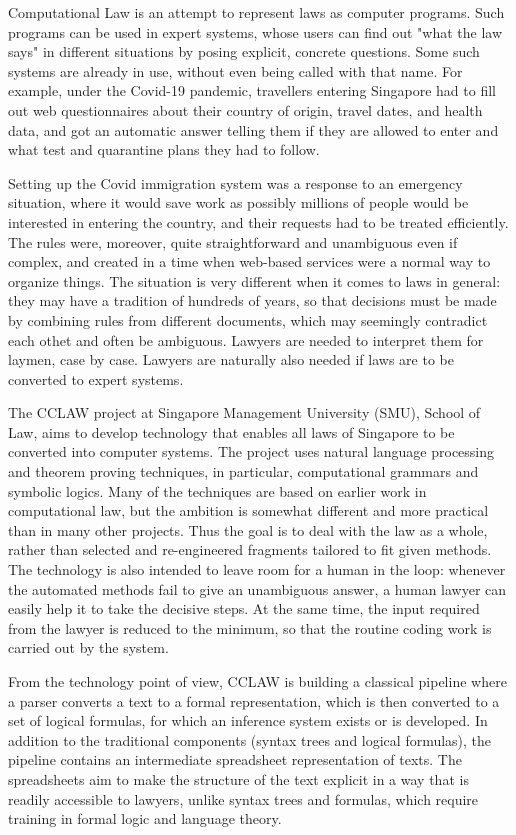 \documentclass{IOS-Book-Article}
\begin{document}
Computational Law is an attempt to represent laws as computer programs.
Such programs can be used in expert systems, whose users can find out "what the law says" in different situations by posing explicit, concrete questions.
Some such systems are already in use, without even being called with that name.
For example, under the Covid-19 pandemic, travellers entering Singapore had to fill out web questionnaires about their country of origin, travel dates, and health data, and got an automatic answer telling them if they are allowed to enter and what test and quarantine plans they had to follow.

Setting up the Covid immigration system was a response to an emergency situation, where it would save work as possibly millions of people would be interested in entering the country, and their requests had to be treated efficiently.
The rules were, moreover, quite straightforward and unambiguous even if complex, and created in a time when web-based services were a normal way to organize things.
The situation is very different when it comes to laws in general: they may have a tradition of hundreds of years, so that decisions must be made by combining rules from different documents, which may seemingly contradict each othet and often be ambiguous.
Lawyers are needed to interpret them for laymen, case by case.
Lawyers are naturally also needed if laws are to be converted to expert systems.

The CCLAW project at Singapore Management University (SMU), School of Law, aims to develop technology that enables all laws of Singapore to be converted into computer systems.
The project uses natural language processing and theorem proving techniques, in particular, computational grammars and symbolic logics.
Many of the techniques are based on earlier work in computational law, but the ambition is somewhat different and more practical than in many other projects.
Thus the goal is to deal with the law as a whole, rather than selected and re-engineered fragments tailored to fit given methods.
The technology is also intended to leave room for a human in the loop: whenever the automated methods fail to give an unambiguous answer, a human lawyer can easily help it to take the decisive steps.
At the same time, the input required from the lawyer is reduced to the minimum, so that the routine coding work is carried out by the system.

From the technology point of view, CCLAW is building a classical pipeline where a parser converts a text to a formal representation, which is then converted to a set of logical formulas, for which an inference system exists or is developed.
In addition to the traditional components (syntax trees and logical formulas), the pipeline contains an intermediate spreadsheet representation of texts.
The spreadsheets aim to make the structure of the text explicit in a way that is readily accessible to lawyers, unlike syntax trees and formulas, which require training in formal logic and language theory.
\end{document}
